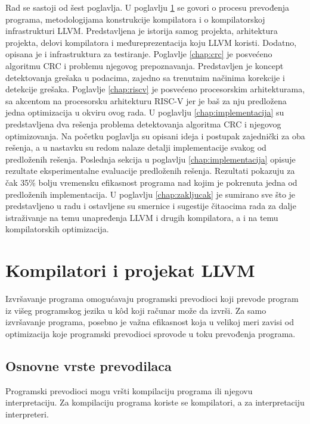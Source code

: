 \documentclass[12pt,oneside]{memoir}
\begin{document}
Rad se sastoji od šest poglavlja. U poglavlju \ref{chap:llvm} se govori o procesu prevođenja programa, metodologijama konstrukcije kompilatora i o kompilatorskoj infrastrukturi LLVM. Predstavljena je istorija samog projekta, arhitektura projekta, delovi kompilatora i međureprezentacija koju LLVM koristi. Dodatno, opisana je i infrastruktura za testiranje. 
Poglavlje \ref{chap:crc} je posvećeno algoritmu CRC i problemu njegovog prepoznavanja. Predstavljen je koncept detektovanja grešaka u podacima, zajedno sa trenutnim načinima korekcije i detekcije grešaka. Poglavlje \ref{chap:riscv} je posvećeno procesorskim arhitekturama, sa akcentom na procesorsku arhitekturu RISC-V jer je baš za nju predložena jedna optimizacija u okviru ovog rada. 
U poglavlju \ref{chap:implementacija} su predstavljena dva rešenja problema detektovanja algoritma CRC i njegovog optimizovanja. Na početku poglavlja su opisani ideja i postupak zajednički za oba rešenja, a u nastavku su redom nalaze detalji implementacije svakog od predloženih rešenja.
Poslednja sekcija u poglavlju \ref{chap:implementacija} opisuje rezultate eksperimentalne evaluacije predloženih rešenja. Rezultati pokazuju za čak 35\% bolju vremensku efikasnost programa nad kojim je pokrenuta jedna od predloženih implementacija. U poglavlju \ref{chap:zakljucak} je sumirano sve što je predstavljeno u radu i ostavljene su smernice i sugestije čitaocima rada za dalje istraživanje na temu unapređenja LLVM i drugih kompilatora, a i na temu kompilatorskih optimizacija. 

\chapter{Kompilatori i projekat LLVM}
\label{chap:llvm}
 
Izvršavanje programa omogućavaju programski prevodioci koji prevode program iz višeg programskog jezika u k\^od koji računar može da izvrši. Za samo izvršavanje programa, posebno je važna efikasnost koja u velikoj meri zavisi od optimizacija koje programski prevodioci sprovode u toku prevođenja programa.  

\section{Osnovne vrste prevodilaca}
Programski prevodioci mogu vršti kompilaciju programa ili njegovu interpretaciju. Za kompilaciju programa koriste se kompilatori, a za interpretaciju interpreteri.
\end{document}

